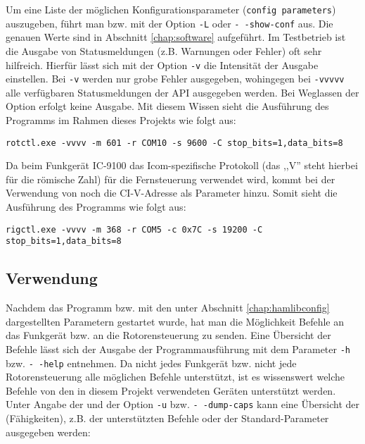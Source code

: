 Um eine Liste der möglichen Konfigurationsparameter (\texttt{config parameters}) auszugeben, führt man  bzw.  mit der Option \texttt{-L} oder \texttt{-\,-show-conf} aus. Die genauen Werte sind in Abschnitt \ref{chap:software} aufgeführt.\newpar
Im Testbetrieb ist die Ausgabe von Statusmeldungen (z.B. Warnungen oder Fehler) oft sehr hilfreich. Hierfür lässt sich mit der Option \texttt{-v} die Intensität der Ausgabe einstellen. Bei \texttt{-v} werden nur grobe Fehler ausgegeben, wohingegen bei \texttt{-vvvvv} alle verfügbaren Statusmeldungen der \ac{API} ausgegeben werden. Bei Weglassen der Option erfolgt keine Ausgabe. Mit diesem Wissen sieht die Ausführung des Programms  im Rahmen dieses Projekts wie folgt aus:

\vspace{-1em}
\begin{shaded}
	\texttt{rotctl.exe -vvvv -m 601 -r COM10 -s 9600 -C stop\_bits=1,data\_bits=8}
\end{shaded}
\vspace{-1em}

Da beim Funkgerät IC-9100 das Icom-spezifische Protokoll  (das ,,V'' steht hierbei für die römische Zahl) für die Fernsteuerung verwendet wird, kommt bei der Verwendung von  noch die CI-V-Adresse als Parameter hinzu. Somit sieht die Ausführung des Programms  wie folgt aus: 

\vspace{-1em}
\begin{shaded}
	\small{\texttt{rigctl.exe -vvvv -m 368 -r COM5 -c 0x7C -s 19200 -C stop\_bits=1,data\_bits=8}}
\end{shaded}

\subsection{Verwendung}
\label{chap:hamlibusage}

Nachdem das Programm  bzw.  mit den unter Abschnitt \ref{chap:hamlibconfig} dargestellten Parametern gestartet wurde, hat man die Möglichkeit Befehle an das Funkgerät bzw. an die Rotorensteuerung zu senden. Eine Übersicht der Befehle lässt sich der Ausgabe der Programmausführung mit dem Parameter \texttt{-h} bzw. \texttt{-\,-help} entnehmen.\newpar
Da nicht jedes Funkgerät bzw. nicht jede Rotorensteuerung alle möglichen Befehle unterstützt, ist es wissenswert welche Befehle von den in diesem Projekt verwendeten Geräten unterstützt werden. Unter Angabe der  und der Option \texttt{-u} bzw. \texttt{-\,-dump-caps} kann eine Übersicht der  (Fähigkeiten), z.B. der unterstützten Befehle oder der Standard-Parameter ausgegeben werden:

